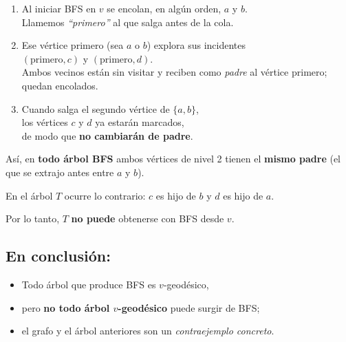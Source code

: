 \documentclass[11pt]{article}
\begin{document}
\begin{enumerate}
  \item Al iniciar BFS en \(v\) se encolan, en algún orden, \(a\) y \(b\).\\
        Llamemos \emph{“primero”} al que salga antes de la cola.

  \item Ese vértice primero (sea \(a\) o \(b\)) explora sus incidentes\\
        \((\text{primero}, c)\) y \((\text{primero}, d)\).\\
        Ambos vecinos están sin visitar y reciben como \emph{padre} al vértice primero; quedan encolados.

  \item Cuando salga el segundo vértice de \(\{a, b\}\),\\
        los vértices \(c\) y \(d\) ya estarán marcados,\\
        de modo que \textbf{no cambiarán de padre}.
\end{enumerate}

Así, en \textbf{todo árbol BFS} ambos vértices de nivel 2  
tienen el \textbf{mismo padre} (el que se extrajo antes entre \(a\) y \(b\)).

En el árbol \(T\) ocurre lo contrario:  
\(c\) es hijo de \(b\) y \(d\) es hijo de \(a\).  

Por lo tanto, \(T\) \textbf{no puede} obtenerse con BFS desde \(v\).

\vspace{1em}

\subsection*{En conclusión:}

\begin{itemize}
  \item Todo árbol que produce BFS es \(v\)-geodésico,

  \item pero \textbf{no todo árbol \(v\)-geodésico} puede surgir de BFS;

  \item el grafo y el árbol anteriores son un \emph{contraejemplo concreto}.
\end{itemize}
\end{document}
